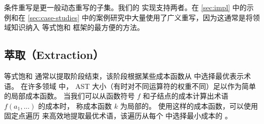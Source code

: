 条件重写是更一般动态重写的子集。我们的 \egg 实现支持两者。在 \autoref{sec:impl} 中的示例和在 \autoref{sec:case-studies} 中的案例研究中大量使用了广义重写，因为这通常是将领域知识纳入 等式饱和 框架的最方便的方法。

\subsection{萃取（Extraction）}
\label{sec:tricks-extraction}

等式饱和 通常以提取阶段结束，该阶段根据某些成本函数从 \eclass 中选择最优表示术语。
在许多领域 \cite{herbie, szalinski} 中，
  AST 大小（有时对不同运算符的权重不同）足以作为简单的局部成本函数。 %
当我们可以从函数符号 $f$ 和子结点的成本计算出术语 $f(a_{1}, ...)$ 的成本时，
  称成本函数 $k$ 为局部的。
使用这样的成本函数，可以使用固定点遍历 \egraph 来高效地提取最优术语，该遍历从每个 \eclass 中选择最小成本的 \enode \cite{herbie}。

